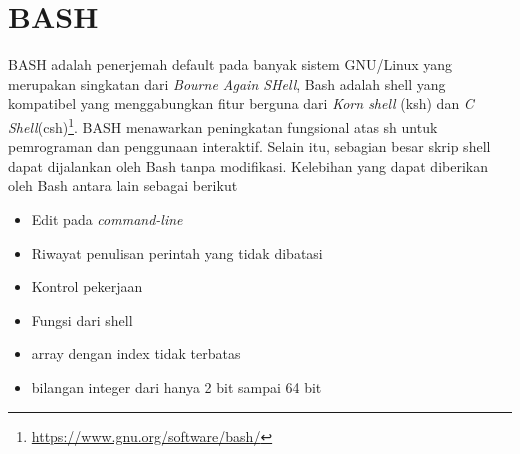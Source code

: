 \section{BASH}
\label{sec:BASH}
BASH adalah penerjemah default pada banyak sistem GNU/Linux yang merupakan singkatan dari \textit{Bourne Again SHell}, Bash adalah  shell yang kompatibel yang menggabungkan fitur berguna dari \textit{Korn shell} (ksh) dan \textit{C Shell}(csh)\footnote{\url{https://www.gnu.org/software/bash/}}. BASH menawarkan peningkatan fungsional atas sh untuk pemrograman dan penggunaan interaktif. Selain itu, sebagian besar skrip shell dapat dijalankan oleh Bash tanpa modifikasi. Kelebihan yang dapat diberikan oleh Bash antara lain sebagai berikut
\begin{itemize}
    \item Edit pada \textit{command-line}
    \item Riwayat penulisan perintah yang tidak dibatasi
    \item Kontrol pekerjaan
    \item Fungsi dari shell
    \item array dengan index tidak terbatas
    \item bilangan integer dari hanya 2 bit sampai 64 bit
\end{itemize}

